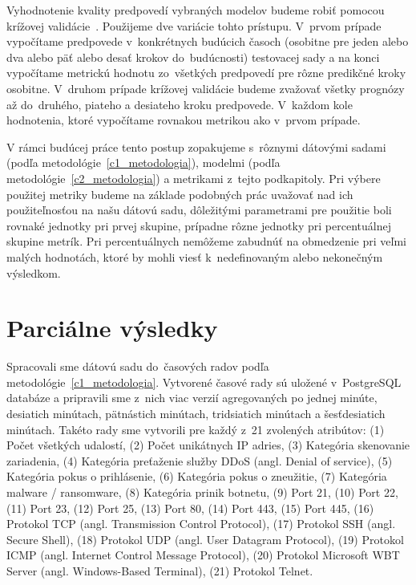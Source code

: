 \documentclass[thesismargins, thesislinespacing, openright, upjsfrontpage]{rnthesis}
\begin{document}
Vyhodnotenie kvality predpovedí vybraných modelov budeme robiť pomocou krížovej validácie~\cite{hyndman2018forecasting}. Použijeme dve variácie tohto prístupu. V~prvom prípade vypočítame predpovede v~konkrétnych budúcich časoch (osobitne pre jeden alebo dva alebo päť alebo desať krokov do~budúcnosti) testovacej sady a na konci vypočítame metrickú hodnotu zo~všetkých predpovedí pre rôzne predikčné kroky osobitne.  V~druhom prípade krížovej validácie budeme zvažovať všetky prognózy až do~druhého, piateho a desiateho kroku predpovede. V~každom kole hodnotenia, ktoré vypočítame rovnakou metrikou ako v~prvom prípade.

V rámci budúcej práce tento postup zopakujeme s~rôznymi dátovými sadami (podľa metodológie~\ref{c1_metodologia}), modelmi (podľa metodológie~\ref{c2_metodologia}) a metrikami z~tejto podkapitoly. Pri výbere použitej metriky budeme na základe podobných prác uvažovať nad ich použiteľnosťou na našu dátovú sadu, dôležitými parametrami pre použitie boli rovnaké jednotky pri prvej skupine, prípadne rôzne jednotky pri percentuálnej skupine metrík. Pri percentuálnych nemôžeme zabudnúť na obmedzenie pri veľmi malých hodnotách, ktoré by mohli viesť k~nedefinovaným alebo nekonečným výsledkom.

\chapter{Parciálne výsledky}

Spracovali sme dátovú sadu do~časových radov podľa metodológie~\ref{c1_metodologia}. Vytvorené časové rady sú uložené v~PostgreSQL databáze a pripravili sme z~nich viac verzií agregovaných po jednej minúte, desiatich minútach, pätnástich minútach, tridsiatich minútach a šesťdesiatich minútach. Takéto rady sme vytvorili pre každý z~21 zvolených atribútov: (1) Počet všetkých udalostí, (2) Počet unikátnych IP adries, (3)  Kategória skenovanie zariadenia, (4) Kategória preťaženie služby DDoS (angl. Denial of service), (5) Kategória pokus o prihlásenie, (6) Kategória pokus o zneužitie, (7) Kategória malware / ransomware, (8) Kategória prinik botnetu, (9) Port 21, (10) Port 22, (11) Port 23, (12) Port 25, (13) Port 80, (14) Port 443, (15) Port 445, (16) Protokol TCP (angl. Transmission Control Protocol), (17) Protokol SSH (angl. Secure Shell), (18) Protokol UDP (angl. User Datagram Protocol), (19) Protokol ICMP (angl. Internet Control Message Protocol), (20) Protokol Microsoft WBT Server (angl. Windows-Based Terminal), (21) Protokol Telnet.
\end{document}
